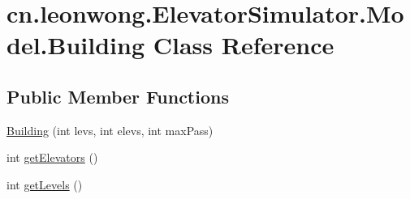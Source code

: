 \hypertarget{classcn_1_1leonwong_1_1_elevator_simulator_1_1_model_1_1_building}{}\section{cn.\+leonwong.\+Elevator\+Simulator.\+Model.\+Building Class Reference}
\label{classcn_1_1leonwong_1_1_elevator_simulator_1_1_model_1_1_building}
\subsection*{Public Member Functions}
\begin{DoxyCompactItemize}
\item 
\hyperlink{classcn_1_1leonwong_1_1_elevator_simulator_1_1_model_1_1_building_a1e083b2c0741e1b45d620401f67b51c3}{Building} (int levs, int elevs, int max\+Pass)
\item 
int \hyperlink{classcn_1_1leonwong_1_1_elevator_simulator_1_1_model_1_1_building_a3cadfe7c0bcba1c58da3e4813985d713}{get\+Elevators} ()
\item 
int \hyperlink{classcn_1_1leonwong_1_1_elevator_simulator_1_1_model_1_1_building_a140ef7ab3469607bd537c51b3da5b833}{get\+Levels} ()
\end{DoxyCompactItemize}
